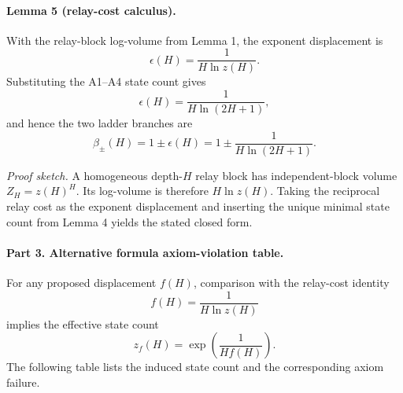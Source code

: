 \paragraph{Lemma 5 (relay-cost calculus).}
With the relay-block log-volume from Lemma 1, the exponent displacement is
\begin{equation}
\epsilon(H)=\frac{1}{H\ln z(H)}.
\end{equation}
Substituting the A1--A4 state count gives
\begin{equation}
\epsilon(H)=\frac{1}{H\ln(2H+1)},
\end{equation}
and hence the two ladder branches are
\begin{equation}
\beta_\pm(H)
=
1\pm \epsilon(H)
=
1\pm \frac{1}{H\ln(2H+1)}.
\end{equation}

\emph{Proof sketch.}
A homogeneous depth-\(H\) relay block has independent-block volume \(Z_H=z(H)^H\). Its log-volume is therefore \(H\ln z(H)\). Taking the reciprocal relay cost as the exponent displacement and inserting the unique minimal state count from Lemma 4 yields the stated closed form.

\paragraph{Part 3. Alternative formula axiom-violation table.}
For any proposed displacement \(f(H)\), comparison with the relay-cost identity
\begin{equation}
f(H)=\frac{1}{H\ln z(H)}
\end{equation}
implies the effective state count
\begin{equation}
z_f(H)=\exp\!\left(\frac{1}{Hf(H)}\right).
\end{equation}
The following table lists the induced state count and the corresponding axiom failure.

